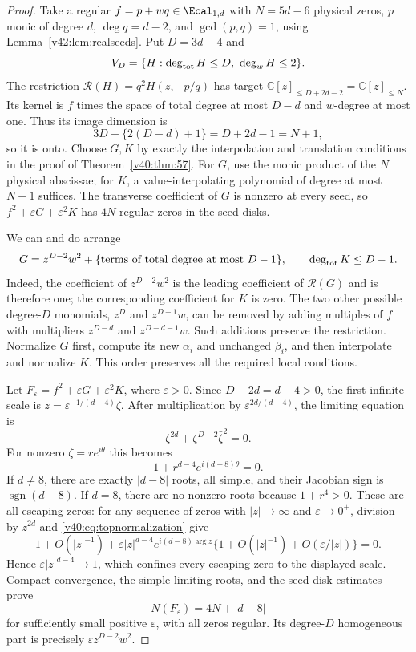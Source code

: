 \documentclass[UTF8,11pt]{ctexart}
\theoremstyle{definition}
\numberwithin{equation}{section}
\begin{document}
\begin{proof}
Take a regular $f=p+wq\in\Ecal_{1,d}$ with
$N=5d-6$ physical zeros, $p$ monic of degree $d$,
$\deg q=d-2$, and $\gcd(p,q)=1$, using
Lemma~\ref{v42:lem:realseeds}. Put $D=3d-4$ and
\[
 V_D=\{H:\deg_{\rm tot}H\le D,\ \deg_wH\le2\}.
\]
The restriction $\mathcal R(H)=q^2H(z,-p/q)$ has target
$\mathbb C[z]_{\le D+2d-2}=\mathbb C[z]_{\le N}$.
Its kernel is $f$ times the space of total degree at most
$D-d$ and $w$-degree at most one. Thus its image dimension is
\[
       3D-\{2(D-d)+1\}=D+2d-1=N+1,
\]
so it is onto. Choose $G,K$ by exactly the interpolation and
translation conditions in the proof of Theorem~\ref{v40:thm:57}.
For $G$, use the monic product of the $N$ physical abscissae;
for $K$, a value-interpolating polynomial of degree at most
$N-1$ suffices. The transverse coefficient of $G$ is nonzero
at every seed, so $f^2+\varepsilon G+\varepsilon^2K$ has
$4N$ regular zeros in the seed disks.

We can and do arrange
\begin{equation}\label{v40:eq:topnormalization}
 G=z^{D-2}w^2+\{\hbox{terms of total degree at most }D-1\},
 \qquad \deg_{\rm tot}K\le D-1.
\end{equation}
Indeed, the coefficient of $z^{D-2}w^2$ is the leading
coefficient of $\mathcal R(G)$ and is therefore one; the
corresponding coefficient for $K$ is zero. The two other
possible degree-$D$ monomials, $z^D$ and $z^{D-1}w$, can
be removed by adding multiples of $f$ with multipliers
$z^{D-d}$ and $z^{D-d-1}w$. Such additions preserve the
restriction. Normalize $G$ first, compute its new $\alpha_i$
and unchanged $\beta_i$, and then interpolate and normalize
$K$. This order preserves all the required local conditions.

Let $F_\varepsilon=f^2+\varepsilon G+\varepsilon^2K$,
where $\varepsilon>0$. Since $D-2d=d-4>0$, the first
infinite scale is
$z=\varepsilon^{-1/(d-4)}\zeta$. After multiplication by
$\varepsilon^{2d/(d-4)}$, the limiting equation is
\[
                      \zeta^{2d}+\zeta^{D-2}\bar\zeta^2=0.
\]
For nonzero $\zeta=re^{i\theta}$ this becomes
\begin{equation}\label{v40:eq:firstinfinity}
                      1+r^{d-4}e^{i(d-8)\theta}=0.
\end{equation}
If $d\ne8$, there are exactly $|d-8|$ roots, all simple,
and their Jacobian sign is $\operatorname{sgn}(d-8)$.
If $d=8$, there are no nonzero roots because $1+r^4>0$.
These are all escaping zeros: for any sequence of zeros
with $|z|\to\infty$ and $\varepsilon\to0^+$, division by
$z^{2d}$ and \eqref{v40:eq:topnormalization} give
\[
 1+O(|z|^{-1})+
 \varepsilon|z|^{d-4}e^{i(d-8)\arg z}
       \{1+O(|z|^{-1})+O(\varepsilon/|z|)\}=0.
\]
Hence $\varepsilon|z|^{d-4}\to1$, which confines every
escaping zero to the displayed scale. Compact convergence,
the simple limiting roots, and the seed-disk estimates prove
\[
                      N(F_\varepsilon)=4N+|d-8|
\]
for sufficiently small positive $\varepsilon$, with all zeros
regular. Its degree-$D$ homogeneous part is precisely
$\varepsilon z^{D-2}w^2$.


\end{proof}
\end{document}
